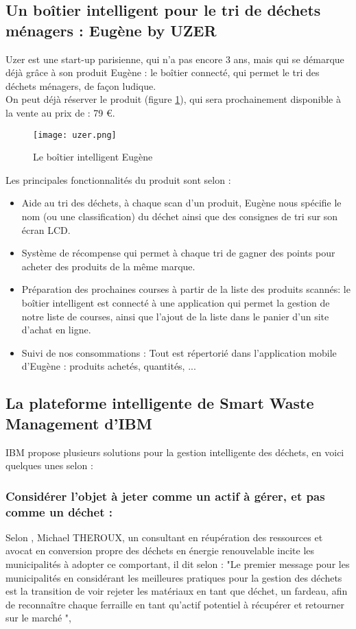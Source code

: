 \documentclass[a4paper,12pt]{report}
\begin{document}
\subsection{Un boîtier intelligent pour le tri de déchets ménagers : Eugène by UZER}
Uzer est une start-up parisienne, qui n'a pas encore 3 ans, mais qui se démarque déjà grâce à son produit Eugène : le boîtier connecté, qui permet le tri des déchets ménagers, de façon ludique.\cite{ref11} \\
On peut déjà réserver le produit (figure \ref{uzer}), qui sera prochainement disponible à la vente au prix de : 79 \euro \cite{ref10}.
\begin {figure}[H]
\begin{center} \texttt{[image: uzer.png]}
\caption{Le boîtier intelligent Eugène \cite{ref10}}
\label{uzer}
\end{center}
\end{figure}
Les principales fonctionnalités du produit sont selon \cite{ref10}:
\begin{itemize}
\item Aide au tri des déchets, à chaque scan d'un produit, Eugène nous spécifie le nom (ou une classification) du déchet ainsi que des consignes de tri sur son écran LCD.
\item Système de récompense qui permet à chaque tri de gagner des points pour acheter des produits de la même marque.
\item Préparation des prochaines courses à partir de la liste des produits scannés: le boîtier intelligent est connecté à une application qui permet la gestion de notre liste de courses, ainsi que l'ajout de la liste dans le panier d'un site d'achat en ligne.
\item Suivi de nos consommations : Tout est répertorié dans l'application mobile d'Eugène : produits achetés, quantités, ...
\end{itemize}

\subsection{La plateforme intelligente de Smart Waste Management d'IBM}
IBM propose plusieurs solutions pour la gestion intelligente des déchets, en voici quelques unes selon \cite{ref24} :

\subsubsection*{Considérer l'objet à jeter comme un actif à gérer, et pas comme un déchet :} 
Selon \cite{ref24}, Michael THEROUX, un consultant en réupération des ressources et avocat en conversion propre des déchets en énergie renouvelable incite les municipalités à adopter ce comportant, il dit selon \cite{ref24} : "Le premier message pour les municipalités en considérant les meilleures pratiques pour la gestion des déchets est la transition de voir rejeter les matériaux en tant que déchet, un fardeau, afin de reconnaître chaque ferraille en tant qu'actif potentiel à récupérer et retourner sur le marché ",
\end{document}
